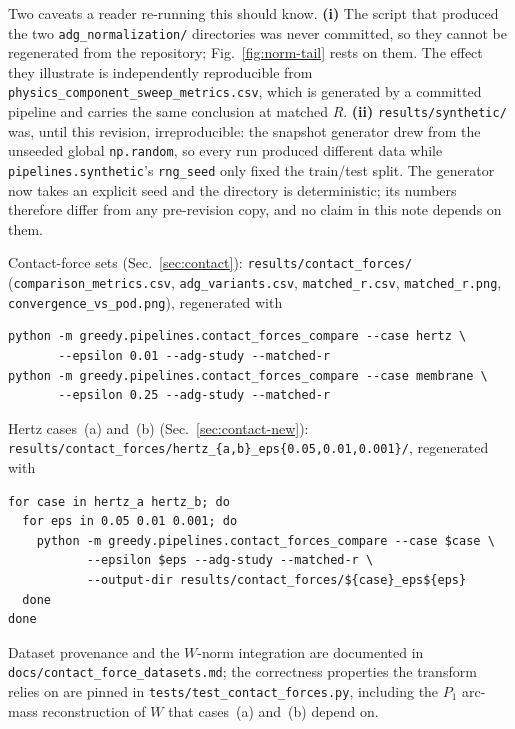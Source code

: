 \documentclass[11pt]{article}
\begin{document}
Two caveats a reader re-running this should know. \textbf{(i)} The script that
produced the two \texttt{adg\_normalization/} directories was never committed, so
they cannot be regenerated from the repository; Fig.~\ref{fig:norm-tail} rests on
them. The effect they illustrate is independently reproducible from
\texttt{physics\_component\_sweep\_metrics.csv}, which is generated by a committed
pipeline and carries the same conclusion at matched $R$.
\textbf{(ii)} \texttt{results/synthetic/} was, until this revision,
irreproducible: the snapshot generator drew from the unseeded global
\texttt{np.random}, so every run produced different data while
\texttt{pipelines.synthetic}'s \texttt{rng\_seed} only fixed the train/test split.
The generator now takes an explicit seed and the directory is deterministic; its
numbers therefore differ from any pre-revision copy, and no claim in this note
depends on them.

Contact-force sets (Sec.~\ref{sec:contact}): \texttt{results/contact\_forces/}
(\texttt{comparison\_metrics.csv}, \texttt{adg\_variants.csv},
\texttt{matched\_r.csv}, \texttt{matched\_r.png},
\texttt{convergence\_vs\_pod.png}), regenerated with
\begin{verbatim}
python -m greedy.pipelines.contact_forces_compare --case hertz \
       --epsilon 0.01 --adg-study --matched-r
python -m greedy.pipelines.contact_forces_compare --case membrane \
       --epsilon 0.25 --adg-study --matched-r
\end{verbatim}
Hertz cases~(a) and~(b) (Sec.~\ref{sec:contact-new}):
\texttt{results/contact\_forces/hertz\_\{a,b\}\_eps\{0.05,0.01,0.001\}/},
regenerated with
\begin{verbatim}
for case in hertz_a hertz_b; do
  for eps in 0.05 0.01 0.001; do
    python -m greedy.pipelines.contact_forces_compare --case $case \
           --epsilon $eps --adg-study --matched-r \
           --output-dir results/contact_forces/${case}_eps${eps}
  done
done
\end{verbatim}
Dataset provenance and the $W$-norm integration are documented in
\texttt{docs/contact\_force\_datasets.md}; the correctness properties the
transform relies on are pinned in \texttt{tests/test\_contact\_forces.py},
including the $P_1$ arc-mass reconstruction of $W$ that cases~(a) and~(b) depend
on.
\end{document}
